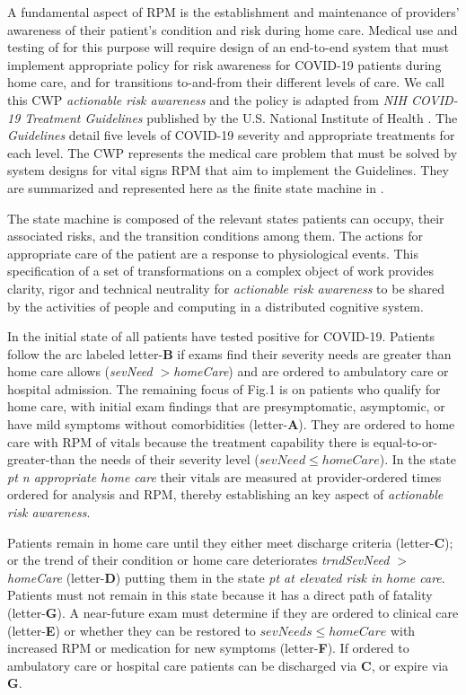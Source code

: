
A fundamental aspect of RPM is the establishment and maintenance of providers' awareness of their patient’s condition and risk during home care.
Medical use and testing of \phware for this purpose will require design of an end-to-end system that must implement appropriate policy for risk awareness for COVID-19 patients during home care, and for transitions to-and-from their different levels of care.
We call this CWP \emph{actionable risk awareness} and the policy is adapted from \emph{NIH COVID-19 Treatment Guidelines} published by the U.S. National Institute of Health \cite{NIH}.
The \emph{Guidelines} detail five levels of COVID-19 severity and appropriate treatments for each level.
The CWP represents the medical care problem that must be solved by system designs for vital signs RPM that aim to implement the Guidelines.
They are summarized and represented here as the finite state machine in .

The state machine is composed of the relevant states patients can occupy, their associated risks, and the transition conditions among them. The actions for appropriate care of the patient are a response to physiological events. This specification of a set of transformations on a complex object of work provides clarity, rigor and technical neutrality for \emph{actionable risk awareness} to be shared by the activities of people and computing in a distributed cognitive system.

In the initial state of  all patients have tested positive for COVID-19. Patients follow the arc labeled letter-\textbf{B} if exams find their severity needs are greater than home care allows (\emph{sevNeed $>$homeCare}) and are ordered to ambulatory care or hospital admission.
The remaining focus of Fig.1 is on patients who qualify for home care, with initial exam findings that are presymptomatic, asymptomic, or have mild symptoms without comorbidities (letter-\textbf{A}).
They are ordered to home care with RPM of vitals because the treatment capability there is equal-to-or-greater-than the needs of their severity level (\emph{$sevNeed \le homeCare$}).
In the state \emph{pt n appropriate home care} their vitals are measured at provider-ordered times ordered for analysis and RPM, thereby establishing an key aspect of \emph{actionable risk awareness}.

Patients remain in home care until they either meet discharge criteria (letter-\textbf{C}); or the trend of their condition or home care deteriorates \emph{trndSevNeed $>$homeCare} (letter-\textbf{D}) putting them in the state \emph{pt at elevated risk in home care}.
Patients must not remain in this state because it has a direct path of fatality (letter-\textbf{G}).
A near-future exam must determine if they are ordered to clinical care (letter-\textbf{E}) or whether they can be restored to \emph{$sevNeeds\le homeCare$} with increased RPM or medication for new symptoms (letter-\textbf{F}).
If ordered to ambulatory care or hospital care patients can be discharged via \textbf{C}, or expire via \textbf{G}.

